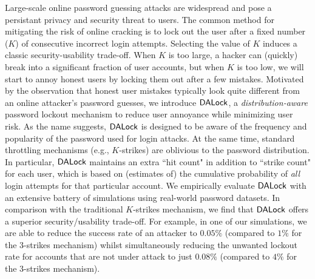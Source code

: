 Large-scale online password guessing attacks are widespread and pose a persistant privacy and security threat to users. The common method for mitigating the risk of online cracking is to lock out the user after a fixed number ($K$) of consecutive incorrect login attempts. Selecting the value of $K$ induces a classic security-usability trade-off. When $K$ is too large, a hacker can (quickly) break into a significant fraction of user accounts, but when $K$ is too low, we will start to annoy honest users by locking them out after a few mistakes. Motivated by the observation that honest user mistakes typically look quite different from an online attacker's password guesses, we introduce $\mathsf{DALock}$, a {\em distribution-aware} password lockout mechanism to reduce user annoyance while minimizing user risk. As the name suggests, $\mathsf{DALock}$ is designed to be aware of the frequency and popularity of the password used for login attacks. At the same time, standard throttling mechanisms (e.g., $K$-strikes) are oblivious to the password distribution. In particular, $\mathsf{DALock}$ maintains an extra ``hit count" in addition to ``strike count" for each user, which is based on (estimates of) the cumulative probability of {\em all} login attempts for that particular account. We empirically evaluate $\mathsf{DALock}$ with an extensive battery of simulations using real-world password datasets. In comparison with the traditional $K$-strikes mechanism, we find that $\mathsf{DALock}$ offers a superior security/usability trade-off. For example, in one of our simulations, we are able to reduce the success rate of an attacker to $0.05\%$ (compared to $1\%$ for the $3$-strikes mechanism) whilst simultaneously reducing the unwanted lockout rate for accounts that are not under attack to just $0.08\%$ (compared to $4\%$ for the $3$-strikes mechanism).  